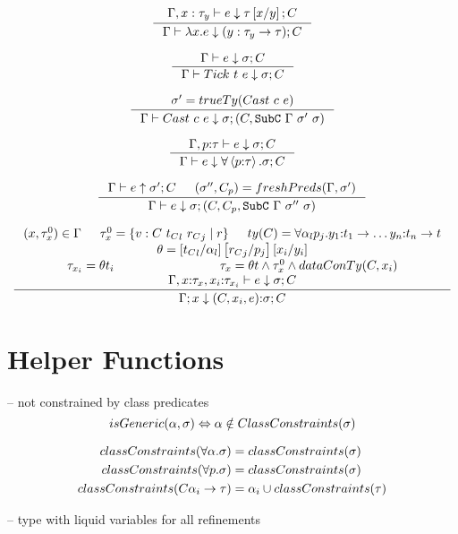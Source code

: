 $$
\inference{
	\checktype{\Gamma, x : \tau_y}{e}{\tau\sub{y}{x}}{C}
}{
	\checktype{\Gamma}{\efun{x}{\tau}{e}}{(\tfun{y}{\tau_y}{\tau})}{C}
}
$$

$$
\inference{
	\checktype{\Gamma}{e}{\sigma}{C}
}{
	\checktype{\Gamma}{Tick\ t\ e}{\sigma}{C}
}
$$

$$
\inference{
	\sigma' = \truety{Cast\ c\ e}
}{
	\checktype{\Gamma}{Cast\ c\ e}{\sigma}{(C, \subc{\Gamma}{\sigma'}{\sigma})}
}
$$

$$
\inference{
	\checktype{\Gamma, p \colon \tau}
	{e}{\sigma}{C} %
}{
	\checktype{\Gamma}{e}
	{\forall \left\langle p \colon \tau \right\rangle . \sigma}{C}
}
$$

$$
\inference{
	\hastype{\Gamma}{e}{\sigma'}{C} &&
	(\sigma'', C_p) = \freshPredsty{\sigma'}
}{
	\checktype{\Gamma}{e}{\sigma}
	{(C, C_p, \subc{\Gamma}{\sigma''}{\sigma})}
}
$$


\hfill\mbox{}
$$
\inference{
	(x,\tau_x^0) \in \Gamma  && \tau_x^0 = \tref{v}{C\ {t_C}_l\ {r_C}_j }{r}  &&
	\ty{C} = \forall \alpha_l p_j . y_1\colon t_1 \rightarrow \dots y_n \colon t_n \rightarrow t &&\\
	\theta = \sub{\alpha_l}{{t_C}_l}\sub{p_j}{{r_C}_j}\sub{y_i}{x_i} &&\\
	\tau_{x_i} = \theta t_i && \tau_x = \theta t \land \tau_x^0 \land \dataconty{C}{x_i} &&\\
	\checktype{\Gamma, x\colon \tau_x, x_i \colon \tau_{x_i}}{e}{\sigma}{C}
}{
	\hastypealt{\Gamma}{x}{(C, x_i, e)}{\sigma}{C}
}
$$


\section*{Helper Functions}
\hfill\isGenericty{\alpha}{\sigma} -- not constrained by class predicates
$$isGeneric(\alpha, \sigma) \Leftrightarrow \alpha \notin ClassConstraints(\sigma)$$ 

\begin{align*}
classConstraints( \forall \alpha . \sigma) &= classConstraints(\sigma)\\ 
classConstraints( \forall p . \sigma) &= classConstraints(\sigma)\\ 
classConstraints(C \alpha_i \rightarrow \tau) &= \alpha_i \cup classConstraints(\tau) 
\end{align*}

\hfill\freshty{\sigma} { -- type with liquid variables for all refinements}\\

